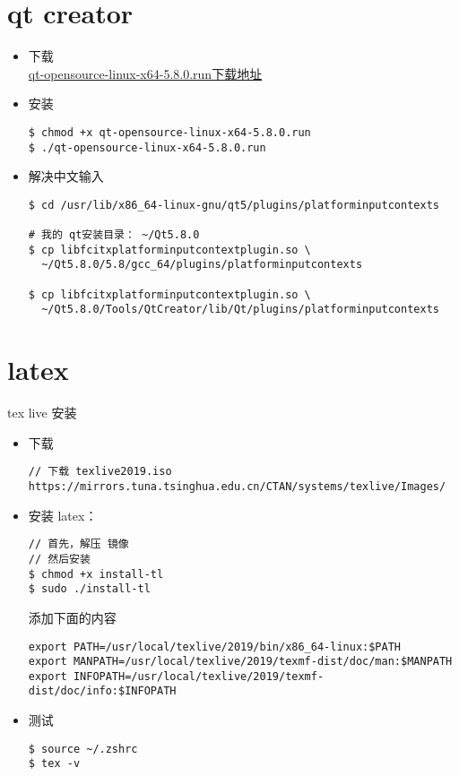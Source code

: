 \section{qt creator}
\begin{itemize}
\item 下载 \\
\href{http://iso.mirrors.ustc.edu.cn/qtproject/archive/qt/5.8/5.8.0/qt-opensource-linux-x64-5.8.0.run}{qt-opensource-linux-x64-5.8.0.run下载地址}

\item 安装
\begin{lstlisting}
$ chmod +x qt-opensource-linux-x64-5.8.0.run 
$ ./qt-opensource-linux-x64-5.8.0.run 
\end{lstlisting}

\item 解决中文输入
\begin{lstlisting}
$ cd /usr/lib/x86_64-linux-gnu/qt5/plugins/platforminputcontexts

# 我的 qt安装目录： ~/Qt5.8.0
$ cp libfcitxplatforminputcontextplugin.so \
  ~/Qt5.8.0/5.8/gcc_64/plugins/platforminputcontexts

$ cp libfcitxplatforminputcontextplugin.so \
  ~/Qt5.8.0/Tools/QtCreator/lib/Qt/plugins/platforminputcontexts
\end{lstlisting}
\end{itemize}
\newpage

\section{latex}
tex live 安装 \\

\begin{itemize}
\item 下载
\begin{lstlisting}
// 下载 texlive2019.iso
https://mirrors.tuna.tsinghua.edu.cn/CTAN/systems/texlive/Images/
\end{lstlisting}

\item 安装 latex：
\begin{lstlisting}
// 首先，解压 镜像
// 然后安装
$ chmod +x install-tl
$ sudo ./install-tl
\end{lstlisting}

添加下面的内容
\begin{lstlisting}
export PATH=/usr/local/texlive/2019/bin/x86_64-linux:$PATH
export MANPATH=/usr/local/texlive/2019/texmf-dist/doc/man:$MANPATH
export INFOPATH=/usr/local/texlive/2019/texmf-dist/doc/info:$INFOPATH
\end{lstlisting}

\item 测试
\begin{lstlisting}
$ source ~/.zshrc
$ tex -v
\end{lstlisting}
\end{itemize}

